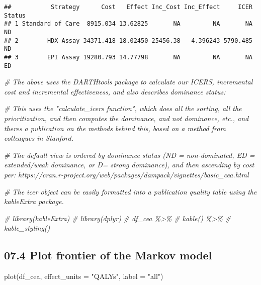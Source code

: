 \documentclass[
]{article}
\newenvironment{Shaded}{\begin{snugshade}}{\end{snugshade}}
\newcommand{\AttributeTok}[1]{\textcolor[rgb]{0.77,0.63,0.00}{#1}}
\newcommand{\CommentTok}[1]{\textcolor[rgb]{0.56,0.35,0.01}{\textit{#1}}}
\newcommand{\FunctionTok}[1]{\textcolor[rgb]{0.00,0.00,0.00}{#1}}
\newcommand{\NormalTok}[1]{#1}
\newcommand{\StringTok}[1]{\textcolor[rgb]{0.31,0.60,0.02}{#1}}
\begin{document}
\begin{verbatim}
##           Strategy      Cost   Effect Inc_Cost Inc_Effect     ICER Status
## 1 Standard of Care  8915.034 13.62825       NA         NA       NA     ND
## 2        HDX Assay 34371.418 18.02450 25456.38   4.396243 5790.485     ND
## 3        EPI Assay 19280.793 14.77798       NA         NA       NA     ED
\end{verbatim}

\begin{Shaded}
\begin{Highlighting}[]
\CommentTok{\# The above uses the DARTHtools package to calculate our ICERS, incremental cost and incremental effectiveness, and also describes dominance status:}

\CommentTok{\# This uses the "calculate\_icers function", which does all the sorting, all the prioritization, and then computes the dominance, and not dominance, etc., and there\textquotesingle{}s a publication on the methods behind this, based on a method from colleagues in Stanford.}

\CommentTok{\# The default view is ordered by dominance status (ND = non{-}dominated, ED = extended/weak dominance, or D= strong dominance), and then ascending by cost per: https://cran.r{-}project.org/web/packages/dampack/vignettes/basic\_cea.html}


\CommentTok{\# The icer object can be easily formatted into a publication quality table using the kableExtra package.}

\CommentTok{\# library(kableExtra)}
\CommentTok{\# library(dplyr)}
\CommentTok{\# df\_cea \%\textgreater{}\%}
\CommentTok{\#  kable() \%\textgreater{}\%}
\CommentTok{\#  kable\_styling()}
\end{Highlighting}
\end{Shaded}

\hypertarget{plot-frontier-of-the-markov-model}{%
\subsection{07.4 Plot frontier of the Markov
model}\label{plot-frontier-of-the-markov-model}}

\begin{Shaded}
\begin{Highlighting}[]
\FunctionTok{plot}\NormalTok{(df\_cea, }\AttributeTok{effect\_units =} \StringTok{"QALYs"}\NormalTok{, }\AttributeTok{label =} \StringTok{"all"}\NormalTok{)}
\end{Highlighting}
\end{Shaded}
\end{document}
